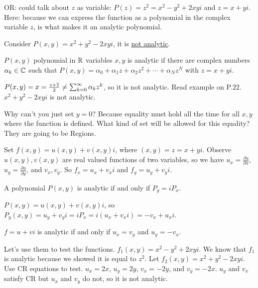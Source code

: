 \documentclass[]{article}
\begin{document}
OR: could talk about $z$ as variable: $P(z) = z^2 = x^2-y^2+2xyi$ and $z=x+yi$.
Here: because we can express the function as a polynomial in the complex variable $z$, is what makes it an analytic polynomial.
\begin{example}
	Consider $P(x,y) = x^2+y^2-2xyi$, it is \underline{not analytic}.
\end{example}

\begin{definition}
	$P(x,y)$ polynomial in $\mathbb{R}$ variables $x,y$ is analytic if there are complex numbers $\alpha_k\in \mathbb{C}$ such that $P(x,y) = \alpha_0 + \alpha_1 z + \alpha_2 z^2 + \cdots + \alpha_N z^N$ with $z=x+yi$.
\end{definition}

\begin{example}
	$P(x,y) = x = \frac{z+\overline{z}}{2} \neq \sum_{k=0}^\infty \alpha_k z^k$, so it is not analytic. Read example on P.22. $x^2+y^2-2xyi$ is not analytic.
\end{example}
Why can't you just set $y=0$? Because equality must hold all the time for all $x,y$ where the function is defined.
What kind of set will be allowed for this equality? They are going to be Regions.

Set $f(x,y) = u(x,y)+v(x,y)i$, where $(x,y)=z=x+yi$. Observe $u(x,y),v(x,y)$ are real valued functions of two variables, so we have $u_x=\frac{\partial u}{\partial x}$, $u_y = \frac{\partial u}{\partial y}$, and $v_x,v_y$. So $f_x = u_x+v_x i$ and $f_y = u_y + v_y i$.

\begin{proposition}
	A polynomial $P(x,y)$ is analytic if and only if $P_y=iP_x$.
\end{proposition}
\begin{example}
	$P(x,y) = u(x,y) + v(x,y) i$, so $P_y(x,y) = u_y + v_y i = iP_x = i(u_x + v_x i) = -v_x + u_x i$.
\end{example}
\begin{definition}
	 $f=u+vi$ is analytic if and only if $u_x=v_y$ and $u_y=-v_x$.
\end{definition}
\begin{example}
	Let's use them to test the functions. $f_1(x,y) = x^2-y^2+2xyi$. We know that $f_1$ is analytic because we showed it is equal to $z^2$. Let $f_2(x,y) = x^2 + y^2 - 2xyi$. Use CR equations to test. $u_x = 2x$, $u_y = 2y$, $v_x=-2y$, and $v_y=-2x$. $u_y$ and $v_x$ satisfy CR but $u_x$ and $v_y$ do not, so it is not analytic.
\end{example}
\end{document}
